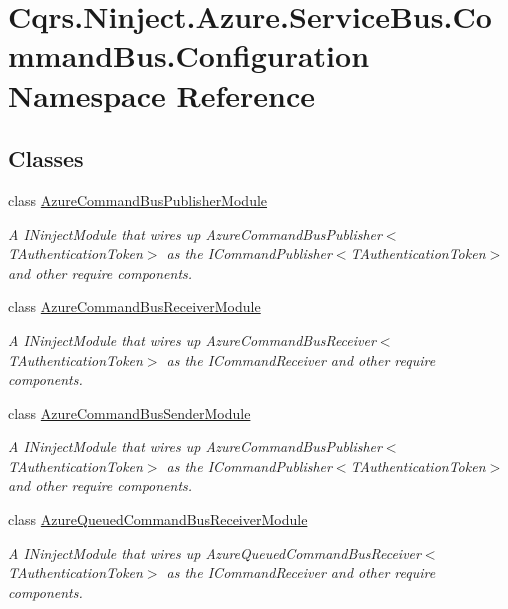 \hypertarget{namespaceCqrs_1_1Ninject_1_1Azure_1_1ServiceBus_1_1CommandBus_1_1Configuration}{}\section{Cqrs.\+Ninject.\+Azure.\+Service\+Bus.\+Command\+Bus.\+Configuration Namespace Reference}
\label{namespaceCqrs_1_1Ninject_1_1Azure_1_1ServiceBus_1_1CommandBus_1_1Configuration}
\subsection*{Classes}
\begin{DoxyCompactItemize}
\item 
class \hyperlink{classCqrs_1_1Ninject_1_1Azure_1_1ServiceBus_1_1CommandBus_1_1Configuration_1_1AzureCommandBusPublisherModule}{Azure\+Command\+Bus\+Publisher\+Module}
\begin{DoxyCompactList}\small\item\em A I\+Ninject\+Module that wires up Azure\+Command\+Bus\+Publisher$<$\+T\+Authentication\+Token$>$ as the I\+Command\+Publisher$<$\+T\+Authentication\+Token$>$ and other require components. \end{DoxyCompactList}\item 
class \hyperlink{classCqrs_1_1Ninject_1_1Azure_1_1ServiceBus_1_1CommandBus_1_1Configuration_1_1AzureCommandBusReceiverModule}{Azure\+Command\+Bus\+Receiver\+Module}
\begin{DoxyCompactList}\small\item\em A I\+Ninject\+Module that wires up Azure\+Command\+Bus\+Receiver$<$\+T\+Authentication\+Token$>$ as the I\+Command\+Receiver and other require components. \end{DoxyCompactList}\item 
class \hyperlink{classCqrs_1_1Ninject_1_1Azure_1_1ServiceBus_1_1CommandBus_1_1Configuration_1_1AzureCommandBusSenderModule}{Azure\+Command\+Bus\+Sender\+Module}
\begin{DoxyCompactList}\small\item\em A I\+Ninject\+Module that wires up Azure\+Command\+Bus\+Publisher$<$\+T\+Authentication\+Token$>$ as the I\+Command\+Publisher$<$\+T\+Authentication\+Token$>$ and other require components. \end{DoxyCompactList}\item 
class \hyperlink{classCqrs_1_1Ninject_1_1Azure_1_1ServiceBus_1_1CommandBus_1_1Configuration_1_1AzureQueuedCommandBusReceiverModule}{Azure\+Queued\+Command\+Bus\+Receiver\+Module}
\begin{DoxyCompactList}\small\item\em A I\+Ninject\+Module that wires up Azure\+Queued\+Command\+Bus\+Receiver$<$\+T\+Authentication\+Token$>$ as the I\+Command\+Receiver and other require components. \end{DoxyCompactList}\end{DoxyCompactItemize}
